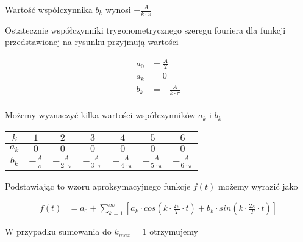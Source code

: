 Wartość współczynnika $b_k$ wynosi $-\frac{A}{k\cdot \pi}$

Ostatecznie współczynniki trygonometrycznego szeregu fouriera dla funkcji przedstawionej na rysunku przyjmują wartości

\begin{equation}
\begin{aligned}
a_0&=\frac{A}{2}\\
a_k&=0\\
b_k&=-\frac{A}{k\cdot \pi}\\
\end{aligned}
\end{equation}

Możemy wyznaczyć kilka wartości współczynników $a_k$ i $b_k$

\begin{table}[H]
  \centering  
  \begin{tabular}{|c|c|c|c|c|c|c|}
    \hline 
    $k$ & $1$ & $2$ & $3$ & $4$ & $5$ & $6$\\ 
    \hline 
    $a_k$ & $0$ & $0$ & $0$ & $0$ & $0$ & $0$\\ 
    \hline 
    $b_k$ & $-\frac{A}{\pi}$ & $-\frac{A}{2\cdot \pi}$ & $-\frac{A}{3\cdot \pi}$ & $-\frac{A}{4\cdot \pi}$ & $-\frac{A}{5\cdot \pi}$ & $-\frac{A}{6\cdot \pi}$\\ 
    \hline 
  \end{tabular} 
\end{table}

Podstawiając to wzoru aproksymacyjnego funkcje $f(t)$ możemy wyrazić jako

\begin{equation}
\begin{aligned}
f(t) &= a_0 + \sum_{k=1}^{\infty} \left[ a_k \cdot cos\left( k \cdot \frac{2\pi}{T} \cdot t\right) + b_k \cdot sin\left(k \cdot \frac{2\pi}{T} \cdot t\right)\right]
\end{aligned}
\end{equation}

W przypadku sumowania do $k_{max}=1$ otrzymujemy 

\begin{figure}[H]
  \centering
\end{figure}

